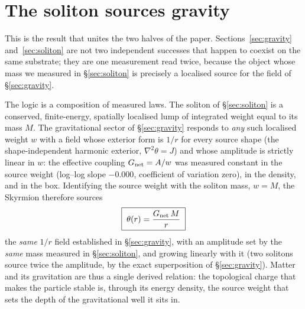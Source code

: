 \documentclass[aps,prd,reprint,nofootinbib,superscriptaddress,floatfix]{revtex4-2}
\theoremstyle{plain}
\begin{document}
\section{The soliton sources gravity}\label{sec:sourcesgravity}

This is the result that unites the two halves of the paper. Sections~\ref{sec:gravity}
and~\ref{sec:soliton} are not two independent successes that happen to coexist on the
same substrate; they are one measurement read twice, because the object whose mass we
measured in \S\ref{sec:soliton} is precisely a localised source for the field of
\S\ref{sec:gravity}.

The logic is a composition of measured laws. The soliton of \S\ref{sec:soliton} is a
conserved, finite-energy, spatially localised lump of integrated weight equal to its
mass $M$. The gravitational sector of \S\ref{sec:gravity} responds to \emph{any} such
localised weight $w$ with a field whose exterior form is $1/r$ for every source shape
(the shape-independent harmonic exterior, $\nabla^2\theta=J$) and whose amplitude is
strictly linear in $w$: the effective coupling $G_{\rm net}=A/w$ was measured constant
in the source weight (log--log slope $-0.000$, coefficient of variation zero), in the
density, and in the box. Identifying the source weight with the soliton mass, $w=M$,
the Skyrmion therefore sources
\begin{equation}
\boxed{\;\theta(r)=\frac{G_{\rm net}\,M}{r}\;}
\label{eq:sourcesgravity}
\end{equation}
the \emph{same} $1/r$ field established in \S\ref{sec:gravity}, with an amplitude set
by the \emph{same} mass measured in \S\ref{sec:soliton}, and growing linearly with it
(two solitons source twice the amplitude, by the exact superposition of
\S\ref{sec:gravity}). Matter and its gravitation are thus a single derived relation:
the topological charge that makes the particle stable is, through its energy density,
the source weight that sets the depth of the gravitational well it sits in.
\end{document}
